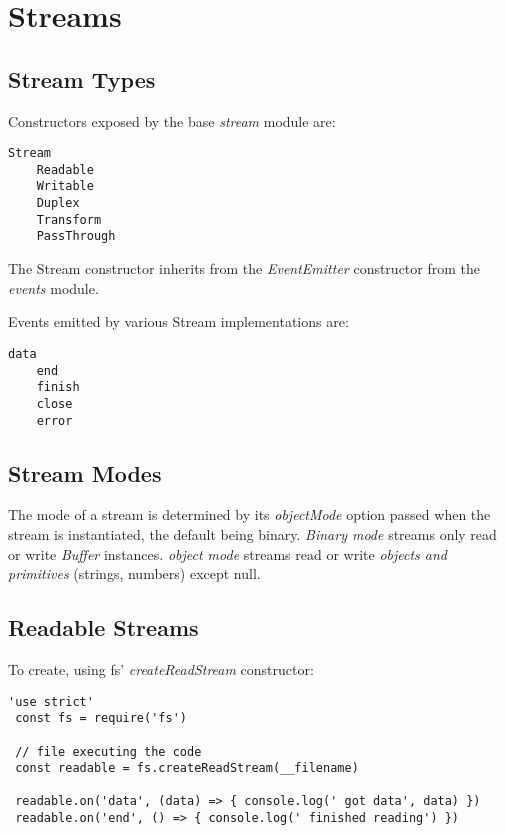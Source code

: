 \documentclass{scrartcl}
\begin{document}
\section{Streams}
\subsection{Stream Types}

Constructors exposed by the base \textit{stream} module are:

\begin{lstlisting}[style=ES6]
    Stream
    Readable
    Writable
    Duplex
    Transform
    PassThrough
\end{lstlisting}

The Stream constructor inherits from the \textit{EventEmitter} constructor from the \textit{events} module.

Events emitted by various Stream implementations are:

\begin{lstlisting}[style=ES6]
    data
    end
    finish
    close
    error
\end{lstlisting}

\subsection{Stream Modes}

The mode of a stream is determined by its \textit{objectMode} option passed when the stream is instantiated, the default being binary. \textit{Binary mode} streams only read or write \textit{Buffer} instances. \textit{object mode} streams read or write \textit{objects and primitives} (strings, numbers) except null.

\subsection{Readable Streams}

To create, using fs' \textit{createReadStream} constructor:

\begin{lstlisting}[style=ES6]
 'use strict'
 const fs = require('fs')

 // file executing the code
 const readable = fs.createReadStream(__filename)

 readable.on('data', (data) => { console.log(' got data', data) })
 readable.on('end', () => { console.log(' finished reading') })

\end{lstlisting}
\end{document}
